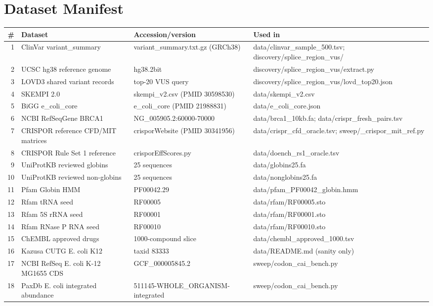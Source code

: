 \section{Dataset Manifest}\begin{center}\scriptsize\begin{tabular}{rp{4.2cm}p{3.6cm}p{5cm}}\hline \# & Dataset & Accession/version & Used in\\\hline
1 & ClinVar variant\_summary & variant\_summary.txt.gz (GRCh38) & data/clinvar\_sample\_500.tsv; discovery/splice\_region\_vus/\\
2 & UCSC hg38 reference genome & hg38.2bit & discovery/splice\_region\_vus/extract.py\\
3 & LOVD3 shared variant records & top-20 VUS query & discovery/splice\_region\_vus/lovd\_top20.json\\
4 & SKEMPI 2.0 & skempi\_v2.csv (PMID 30598530) & data/skempi\_v2.csv\\
5 & BiGG e\_coli\_core & e\_coli\_core (PMID 21988831) & data/e\_coli\_core.json\\
6 & NCBI RefSeqGene BRCA1 & NG\_005905.2:60000-70000 & data/brca1\_10kb.fa; data/crispr\_fresh\_pairs.tsv\\
7 & CRISPOR reference CFD/MIT matrices & crisporWebsite (PMID 30341956) & data/crispr\_cfd\_oracle.tsv; sweep/\_crispor\_mit\_ref.py\\
8 & CRISPOR Rule Set 1 reference & crisporEffScores.py & data/doench\_rs1\_oracle.tsv\\
9 & UniProtKB reviewed globins & 25 sequences & data/globins25.fa\\
10 & UniProtKB reviewed non-globins & 25 sequences & data/nonglobins25.fa\\
11 & Pfam Globin HMM & PF00042.29 & data/pfam\_PF00042\_globin.hmm\\
12 & Rfam tRNA seed & RF00005 & data/rfam/RF00005.sto\\
13 & Rfam 5S rRNA seed & RF00001 & data/rfam/RF00001.sto\\
14 & Rfam RNase P RNA seed & RF00010 & data/rfam/RF00010.sto\\
15 & ChEMBL approved drugs & 1000-compound slice & data/chembl\_approved\_1000.tsv\\
16 & Kazusa CUTG E. coli K12 & taxid 83333 & data/README.md (sanity only)\\
17 & NCBI RefSeq E. coli K-12 MG1655 CDS & GCF\_000005845.2 & sweep/codon\_cai\_bench.py\\
18 & PaxDb E. coli integrated abundance & 511145-WHOLE\_ORGANISM-integrated & sweep/codon\_cai\_bench.py\\

\end{tabular}
\end{center}
